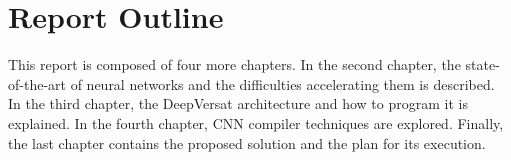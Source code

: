 



\section{Report Outline}
\label{reportoutline}

This report is composed of four more chapters. In the second chapter, the
state-of-the-art of neural networks and the difficulties accelerating them is
described. In the third chapter, the DeepVersat architecture and how to program
it is explained. In the fourth chapter, CNN compiler techniques are
explored. Finally, the last chapter contains the proposed solution and the plan
for its execution.


